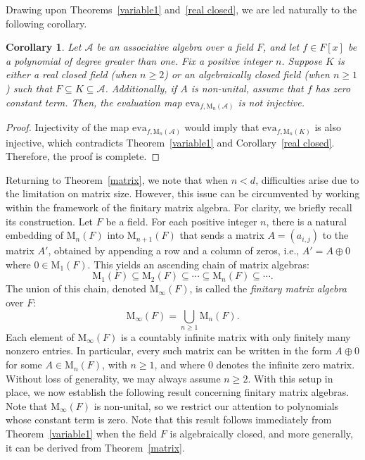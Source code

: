\documentclass{amsart}
\newtheorem{corollary}[theorem]{Corollary}
\theoremstyle{definition}
\begin{document}
	
	Drawing upon Theorems~\ref{variable1} and~\ref{real closed}, we are led naturally to the following corollary.
	
	\begin{corollary}\label{ss}
		Let \( \mathcal{A} \) be an associative algebra over a field \( F \), and let \( f \in F[x] \) be a polynomial of degree greater than one. Fix a positive integer \( n \). Suppose \( K \) is either a real closed field (when \( n \geq 2 \)) or an algebraically closed field (when \( n \geq 1 \)) such that \( F \subseteq K \subseteq \mathcal{A} \). Additionally, if \( A \) is non-unital, assume that \( f \) has zero constant term. Then, the evaluation map \( \mathrm{eva}_{f,\mathrm{M}_n(\mathcal{A})} \) is not injective.
	\end{corollary}
	
	\begin{proof}
		Injectivity of the map \( \mathrm{eva}_{f,\mathrm{M}_n(\mathcal{A})} \) would imply that \( \mathrm{eva}_{f,\mathrm{M}_n(K)} \) is also injective, which contradicts Theorem~\ref{variable1} and Corollary~\ref{real closed}. Therefore, the proof is complete.
	\end{proof}
	
	
	
	Returning to Theorem~\ref{matrix}, we note that when \( n < d \), difficulties arise due to the limitation on matrix size. However, this issue can be circumvented by working within the framework of the finitary matrix algebra. For clarity, we briefly recall its construction. Let \( F \) be a field. For each positive integer \( n \), there is a natural embedding of \( \mathrm{M}_n(F) \) into \( \mathrm{M}_{n+1}(F) \) that sends a matrix \( A = (a_{i,j}) \) to the matrix \( A' \), obtained by appending a row and a column of zeros, i.e., \( A' = A \oplus 0 \) where $0\in\mathrm{M}_1(F)$. This yields an ascending chain of matrix algebras:
	\[
	\mathrm{M}_1(F) \subseteq \mathrm{M}_2(F) \subseteq \cdots \subseteq \mathrm{M}_n(F) \subseteq \cdots.
	\]
	The union of this chain, denoted \( \mathrm{M}_\infty(F) \), is called the \emph{finitary matrix algebra} over \( F \):
	\[
	\mathrm{M}_\infty(F) = \bigcup_{n \geq 1} \mathrm{M}_n(F).
	\]
	Each element of \( \mathrm{M}_\infty(F) \) is a countably infinite matrix with only finitely many nonzero entries. In particular, every such matrix can be written in the form \( A \oplus 0 \) for some \( A \in \mathrm{M}_n(F) \), with \( n \geq 1 \), and where \( 0 \) denotes the infinite zero matrix. Without loss of generality, we may always assume \( n \geq 2 \). With this setup in place, we now establish the following result concerning finitary matrix algebras. 	Note that $\mathrm{M}_\infty(F)$ is non-unital, so we restrict our attention to polynomials whose constant term is zero. Note that this result follows immediately from Theorem~\ref{variable1} when the field \( F \) is algebraically closed, and more generally, it can be derived from Theorem~\ref{matrix}.
	
\end{document}
